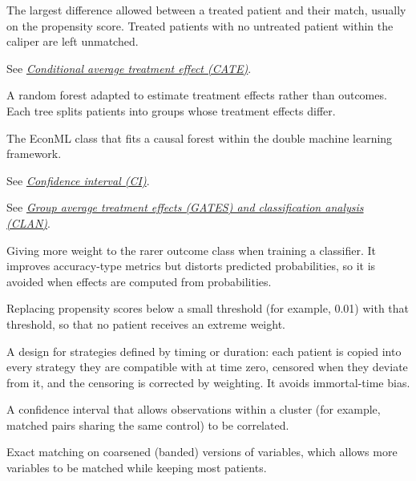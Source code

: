 \begin{description}[style=nextline, leftmargin=1.2em, itemsep=3pt, font=\normalfont\bfseries]
\item[Caliper]
The largest difference allowed between a treated patient and their match, usually on the propensity score. Treated patients with no untreated patient within the caliper are left unmatched.

\item[CATE]
See \emph{\hyperref[gl:cate]{Conditional average treatment effect (CATE)}}.

\item[Causal forest]
A random forest adapted to estimate treatment effects rather than outcomes. Each tree splits patients into groups whose treatment effects differ.

\item[CausalForestDML]
The EconML class that fits a causal forest within the double machine learning framework.

\item[CI]
See \emph{\hyperref[gl:ci]{Confidence interval (CI)}}.

\item[CLAN]
See \emph{\hyperref[gl:gates]{Group average treatment effects (GATES) and classification analysis (CLAN)}}.

\item[Class weighting]
Giving more weight to the rarer outcome class when training a classifier. It improves accuracy-type metrics but distorts predicted probabilities, so it is avoided when effects are computed from probabilities.

\item[Clipping (of propensity scores)]
Replacing propensity scores below a small threshold (for example, 0.01) with that threshold, so that no patient receives an extreme weight.

\item[Clone-censor-weight]
A design for strategies defined by timing or duration: each patient is copied into every strategy they are compatible with at time zero, censored when they deviate from it, and the censoring is corrected by weighting. It avoids immortal-time bias.

\item[Cluster-robust confidence interval]
A confidence interval that allows observations within a cluster (for example, matched pairs sharing the same control) to be correlated.

\item[Coarsened exact matching]
Exact matching on coarsened (banded) versions of variables, which allows more variables to be matched while keeping most patients.


\end{description}

